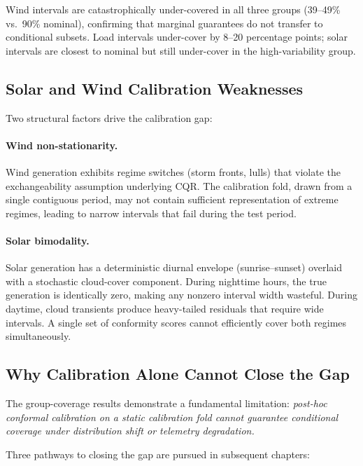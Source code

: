 Wind intervals are catastrophically under-covered in all three groups
(39--49\% vs.\ 90\% nominal), confirming that marginal guarantees do not
transfer to conditional subsets.  Load intervals under-cover by 8--20
percentage points; solar intervals are closest to nominal but still
under-cover in the high-variability group.

\subsection{Solar and Wind Calibration Weaknesses}
\label{sec:calibration-weaknesses}

Two structural factors drive the calibration gap:

\paragraph{Wind non-stationarity.}
Wind generation exhibits regime switches (storm fronts, lulls) that
violate the exchangeability assumption underlying CQR.  The calibration
fold, drawn from a single contiguous period, may not contain sufficient
representation of extreme regimes, leading to narrow intervals that
fail during the test period.

\paragraph{Solar bimodality.}
Solar generation has a deterministic diurnal envelope (sunrise--sunset)
overlaid with a stochastic cloud-cover component.  During nighttime hours,
the true generation is identically zero, making any nonzero interval
width wasteful.  During daytime, cloud transients produce heavy-tailed
residuals that require wide intervals.  A single set of conformity
scores cannot efficiently cover both regimes simultaneously.

\subsection{Why Calibration Alone Cannot Close the Gap}

The group-coverage results demonstrate a fundamental limitation:
\emph{post-hoc conformal calibration on a static calibration fold cannot
guarantee conditional coverage under distribution shift or telemetry
degradation.}

Three pathways to closing the gap are pursued in subsequent chapters:

